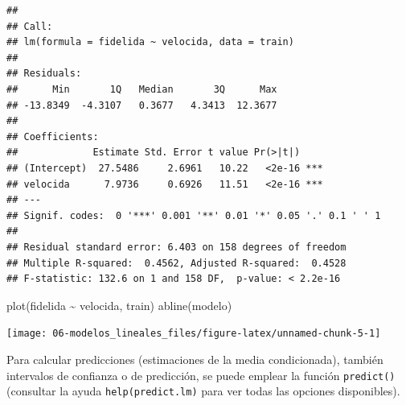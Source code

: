 \documentclass[
  spanish,
]{book}
\newenvironment{Shaded}{\begin{snugshade}}{\end{snugshade}}
\newcommand{\FunctionTok}[1]{\textcolor[rgb]{0.00,0.00,0.00}{#1}}
\newcommand{\NormalTok}[1]{#1}
\newcommand{\SpecialCharTok}[1]{\textcolor[rgb]{0.00,0.00,0.00}{#1}}
\theoremstyle{break}
\theoremstyle{definition}
\theoremstyle{definition}
\theoremstyle{definition}
\theoremstyle{definition}
\theoremstyle{remark}
\begin{document}
\begin{verbatim}
## 
## Call:
## lm(formula = fidelida ~ velocida, data = train)
## 
## Residuals:
##      Min       1Q   Median       3Q      Max 
## -13.8349  -4.3107   0.3677   4.3413  12.3677 
## 
## Coefficients:
##             Estimate Std. Error t value Pr(>|t|)    
## (Intercept)  27.5486     2.6961   10.22   <2e-16 ***
## velocida      7.9736     0.6926   11.51   <2e-16 ***
## ---
## Signif. codes:  0 '***' 0.001 '**' 0.01 '*' 0.05 '.' 0.1 ' ' 1
## 
## Residual standard error: 6.403 on 158 degrees of freedom
## Multiple R-squared:  0.4562, Adjusted R-squared:  0.4528 
## F-statistic: 132.6 on 1 and 158 DF,  p-value: < 2.2e-16
\end{verbatim}

\begin{Shaded}
\begin{Highlighting}[]
\FunctionTok{plot}\NormalTok{(fidelida }\SpecialCharTok{\textasciitilde{}}\NormalTok{ velocida, train)}
\FunctionTok{abline}\NormalTok{(modelo)}
\end{Highlighting}
\end{Shaded}

\begin{center}\texttt{[image: 06-modelos\_lineales\_files/figure-latex/unnamed-chunk-5-1]} \end{center}

Para calcular predicciones (estimaciones de la media condicionada), también intervalos de confianza o de predicción, se puede emplear la función \texttt{predict()} (consultar la ayuda \texttt{help(predict.lm)} para ver todas las opciones disponibles).
\end{document}
